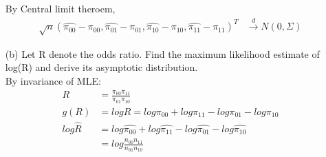 \begin{itemize}
	By Central limit theroem, 
	\begin{align*}
		\sqrt{n} (\hat{\pi_{00}} - \pi_{00}, \hat{\pi_{01}}- \pi_{01}, \hat{\pi_{10}} - \pi_{10}, \hat{\pi_{11}}- \pi_{11} )^T & \xrightarrow[]{d} N(0, \Sigma)
	\end{align*}
	\item[(b)] Let R denote the odds ratio. Find the maximum likelihood estimate of log(R) and
	derive its asymptotic distribution.\\
	By invariance of MLE:
	\begin{align*}
		R & =  \frac{\pi_{00}\pi_{11}}{\pi_{01}\pi_{10}}\\
		g(R) &= log R = log \pi_{00} + log \pi_{11}- log \pi_{01}- log \pi_{10}\\
		log \hat{R} & = log \hat{\pi_{00}} + log \hat{\pi_{11}}- log \hat{\pi_{01}}- log \hat{\pi_{10}}\\
		&= log \frac{n_{00}n_{11}}{n_{01}n_{10}}
	\end{align*}
	

\end{itemize}
